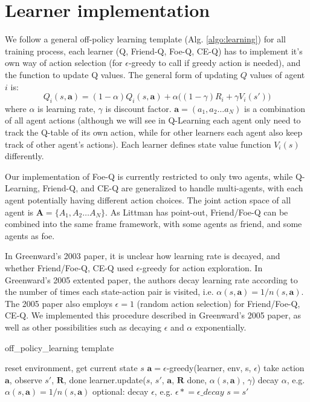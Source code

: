 \documentclass[conference]{IEEEtran}
\newcommand{\asteq}{\mathrel{*}=}
\begin{document}
\section{Learner implementation}
We follow a general off-policy learning template (Alg. \ref{algo:learning}) for all training process, each learner (Q, Friend-Q, Foe-Q, CE-Q) has to implement it's own way of action selection (for $\epsilon$-greedy to call if greedy action is needed), and the function to update Q values. The general form of updating $Q$ values of agent $i$ is:
\begin{equation}
Q_i(s, \mathbf{a}) = (1-\alpha) Q_i(s, \mathbf{a}) + \alpha  \big( (1-\gamma) R_i + \gamma V_i(s') \big)
\label{eq:update}
\end{equation}
where $\alpha$ is learning rate, $\gamma$ is discount factor. $\mathbf{a}=(a_1, a_2\dots a_N)$ is a combination of all agent actions (although we will see in Q-Learning each agent only need to track the Q-table of its own action, while for other learners each agent also keep track of other agent's actions). Each learner defines state value function $V_i(s)$ differently.

Our implementation of Foe-Q is currently restricted to only two agents, while Q-Learning, Friend-Q, and CE-Q are generalized to handle multi-agents, with each agent potentially having different action choices. The joint action space of all agent is $\mathbf{A}=\{A_1, A_2 \dots A_N\}$. As Littman has point-out, Friend/Foe-Q can be combined into the same frame framework, with some agents as friend, and some agents as foe.

In Greenward's 2003 paper, it is unclear how learning rate is decayed, and whether Friend/Foe-Q, CE-Q used $\epsilon$-greedy for action exploration. In Greenward's 2005 extented paper, the authors decay learning rate according to the number of times each state-action pair is visited, i.e. $\alpha(s,\mathbf{a}) = 1/n(s,\mathbf{a})$. The 2005 paper also employs $\epsilon=1$ (random action selection) for Friend/Foe-Q, CE-Q. We implemented this procedure described in Greenward's 2005 paper, as well as other possibilities such as decaying $\epsilon$ and $\alpha$ exponentially.

\begin{algorithm}[h!]
	\caption{off\_policy\_learning template}
	\begin{algorithmic}
				\State reset environment, get current state $s$
					\State $\mathbf{a} = \epsilon$-greedy(learner, env, s, $\epsilon$)
					\State take action $\mathbf{a}$, observe $s'$, $\mathbf{R}$, done
					\State learner.update($s$, $s'$, $\mathbf{a}$, $\mathbf{R}$ done, $\alpha(s,\mathbf{a})$, $\gamma$)
				    \State decay $\alpha$, e.g. $\alpha(s,\mathbf{a}) = 1/n(s,\mathbf{a})$
				    \State optional: decay $\epsilon$, e.g. $\epsilon \asteq \epsilon\_decay$
				    \State $s=s'$
				\EndFor			
			\EndFor
		\EndFunction
	\end{algorithmic}
	\label{algo:learning}
\end{algorithm}
\end{document}
